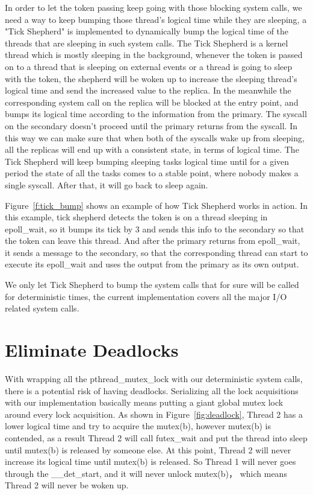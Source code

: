 In order to let the token passing keep going with those blocking system calls, we need a way to keep bumping those thread's logical time while they are sleeping, a "Tick Shepherd" is implemented to dynamically bump the logical time of the threads that are sleeping in such system calls. The Tick Shepherd is a kernel thread which is mostly sleeping in the background, whenever the token is passed on to a thread that is sleeping on external events or a thread is going to sleep with the token, the shepherd will be woken up to increase the sleeping thread's logical time and send the increased value to the replica. In the meanwhile the corresponding system call on the replica will be blocked at the entry point, and bumps its logical time according to the information from the primary. The syscall on the secondary doesn't proceed until the primary returns from the syscall. In this way we can make sure that when both of the syscalls wake up from sleeping, all the replicas will end up with a consistent state, in terms of logical time. The Tick Shepherd will keep bumping sleeping tasks logical time until for a given period the state of all the tasks comes to a stable point, where nobody makes a single syscall. After that, it will go back to sleep again.

Figure~\ref{f:tick_bump} shows an example of how Tick Shepherd works in action. In this example, tick shepherd detects the token is on a thread sleeping in epoll\_wait, so it bumps its tick by 3 and sends this info to the secondary so that the token can leave this thread. And after the primary returns from epoll\_wait, it sends a message to the secondary, so that the corresponding thread can start to execute its epoll\_wait and uses the output from the primary as its own output.


We only let Tick Shepherd to bump the system calls that for sure will be called for deterministic times, the current implementation covers all the major I/O related system calls.

\section{Eliminate Deadlocks} \label{sec:edeadlock}
With wrapping all the pthread\_mutex\_lock with our deterministic system calls, there is a potential risk of having deadlocks. Serializing all the lock acquisitions with our implementation basically means putting a giant global mutex lock around every lock acquisition. As shown in Figure~\ref{fig:deadlock}, Thread 2 has a lower logical time and try to acquire the mutex(b), however mutex(b) is contended, as a result Thread 2 will call futex\_wait and put the thread into sleep until mutex(b) is released by someone else. At this point, Thread 2 will never increase its logical time until mutex(b) is released. So Thread 1 will never goes through the \_\_det\_start, and it will never unlock mutex(b)， which means Thread 2 will never be woken up.

